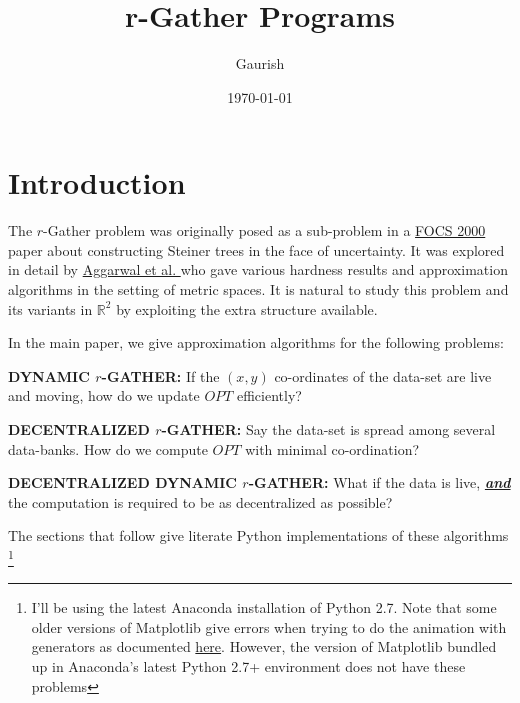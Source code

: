 \documentclass[11pt]{article}
\author{Gaurish}
\date{\today}
\title{r-Gather Programs}
\begin{document}
\maketitle
\tableofcontents

\section{Introduction}
\label{sec-1}

The $r$-Gather problem was originally posed as a sub-problem in a \href{http://people.csail.mit.edu/karger/Papers/maybecast.pdf}{FOCS 2000} paper about constructing Steiner trees in 
the face of uncertainty. It was explored in detail by \href{http://static.googleusercontent.com/media/research.google.com/en//pubs/archive/41225.pdf}{Aggarwal et al. }who gave various hardness results and 
approximation algorithms in the setting of metric spaces. It is natural to study this problem and its variants 
in $\mathbb{R}^2$ by exploiting the extra structure available. 

In the main paper, we give approximation algorithms for the following problems:

\textbf{DYNAMIC $r$-GATHER:}      If the $(x,y)$ co-ordinates of the data-set are live and moving, how do we update 
$OPT$ efficiently? 

\textbf{DECENTRALIZED $r$-GATHER:} Say the data-set is spread among several data-banks. How do we compute $OPT$ 
with minimal co-ordination? 

\textbf{DECENTRALIZED DYNAMIC $r$-GATHER:}  What if the data is live, \uline{\emph{\textbf{and}}} the computation 
is required to be as decentralized as possible?  

The sections that follow give literate Python implementations of these algorithms \footnote{I'll be using the latest Anaconda installation of Python 2.7. Note that some older versions of Matplotlib give errors 
when trying to do the animation with generators as documented \href{https://github.com/matplotlib/matplotlib/pull/2634}{here}. However, the version of Matplotlib bundled up in Anaconda's latest Python 2.7+ environment does not have these problems} 
\end{document}
